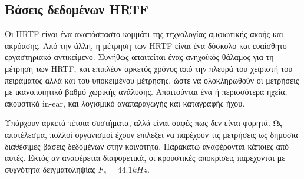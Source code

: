 \subsection{Βάσεις δεδομένων HRTF}

Οι HRTF είναι ένα αναπόσπαστο κομμάτι της τεχνολογίας αμφιωτικής ακοής και ακρόασης. Από την άλλη, η μέτρηση των HRTF είναι ένα δύσκολο και ευαίσθητο εργαστηριακό αντικείμενο. Συνήθως απαιτείται ένας ανηχοϊκός θάλαμος για τη μέτρηση των HRTF, και επιπλέον αρκετός χρόνος από την πλευρά του χειριστή του πειράματος αλλά και του υποκειμένου μέτρησης, ώστε να ολοκληρωθούν οι μετρήσεις με ικανοποιητικό βαθμό χωρικής ανάλυσης. Απαιτούνται ένα ή περισσότερα ηχεία, ακουστικά in-ear, και λογισμικό αναπαραγωγής και καταγραφής ήχου. 

Υπάρχουν αρκετά τέτοια συστήματα, αλλά είναι σαφές πως δεν είναι φορητά. Ως αποτέλεσμα, πολλοί οργανισμοί έχουν επιλέξει να παρέχουν τις μετρήσεις ως δημόσια διαθέσιμες βάσεις δεδομένων στην κοινότητα. Παρακάτω αναφέρονται κάποιες από αυτές. Εκτός αν αναφέρεται διαφορετικά, οι κρουστικές αποκρίσεις παρέχονται με συχνότητα δειγματοληψίας $F_s = 44.1 kHz$.

